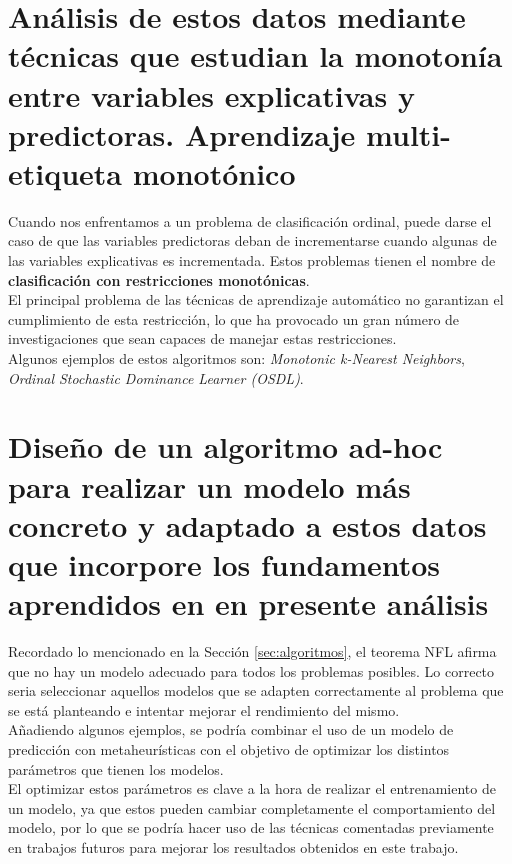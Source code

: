 \section*{Análisis de estos datos mediante técnicas que estudian la monotonía entre variables explicativas y predictoras. Aprendizaje multi-etiqueta monotónico}
Cuando nos enfrentamos a un problema de clasificación ordinal, puede darse el caso de que las variables predictoras deban de incrementarse cuando algunas de las variables explicativas es incrementada. Estos problemas tienen el nombre de \textbf{clasificación con restricciones monotónicas}.\\
\linebreak
El principal problema de las técnicas de aprendizaje automático no garantizan el cumplimiento de esta restricción, lo que ha provocado un gran número de investigaciones que sean capaces de manejar estas restricciones.\\
Algunos ejemplos de estos algoritmos son: \textit{Monotonic k-Nearest Neighbors}, \textit{Ordinal Stochastic Dominance Learner (OSDL)}.
\section*{Diseño de un algoritmo ad-hoc para realizar un modelo más concreto y adaptado a estos datos que incorpore los fundamentos aprendidos en en presente análisis}
Recordado lo mencionado en la Sección \ref{sec:algoritmos}, el teorema NFL afirma que no hay un modelo adecuado para todos los problemas posibles. Lo correcto seria seleccionar aquellos modelos que se adapten correctamente al problema que se está planteando e intentar mejorar el rendimiento del mismo.\\
\linebreak
Añadiendo algunos ejemplos, se podría combinar el uso de un modelo de predicción con metaheurísticas con el objetivo de optimizar los distintos parámetros que tienen los modelos.\\
El optimizar estos parámetros es clave a la hora de realizar el entrenamiento de un modelo, ya que estos pueden cambiar completamente el comportamiento del modelo, por lo que se podría hacer uso de las técnicas comentadas previamente en trabajos futuros para mejorar los resultados obtenidos en este trabajo.
